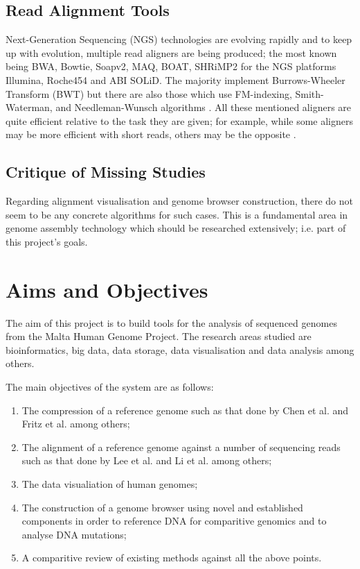 \documentclass{csfyp}
\begin{document}
\subsection{Read Alignment Tools}
Next-Generation Sequencing (NGS) technologies are evolving rapidly and to keep up with evolution, multiple read aligners are being produced; the most known being BWA, Bowtie, Soapv2, MAQ, BOAT, SHRiMP2 for the NGS platforms Illumina, Roche454 and ABI SOLiD.  The majority implement Burrows-Wheeler Transform (BWT) but there are also those which use FM-indexing, Smith-Waterman,  and Needleman-Wunsch algorithms \cite{bwtransform, popgen, cgreads}.  All these mentioned aligners are quite efficient relative to the task they are given; for example, while some aligners may be more efficient with short reads, others may be the opposite \cite{companalys, compalign}. 

\subsection{Critique of Missing Studies}
Regarding alignment visualisation and genome browser construction, there do not seem to be any concrete algorithms for such cases.  This is a fundamental area in genome assembly technology which should be researched extensively; i.e. part of this project's goals.     

\section{Aims and Objectives}

The aim of this project is to build tools for the analysis of sequenced genomes from the Malta Human Genome Project.  The research areas studied are bioinformatics, big data, data storage, data visualisation and data analysis among others.

The main objectives of the system are as follows:

\begin{enumerate}[nolistsep]

   \item The compression of a reference genome such as that done by Chen et al. \cite{gencompress} and Fritz et al. \cite{refcompression} among others;

  \item The alignment of a reference genome against a number of sequencing reads such as that done by Lee et al. \cite{cgreads} and Li et al. \cite{bwtransform} among others;

  \item The data visualiation of human genomes;

  \item The construction of a genome browser using novel and established components in order to reference DNA for comparitive genomics and to analyse DNA mutations;  

  \item A comparitive review of existing methods against all the above points.

\end{enumerate}
\end{document}
